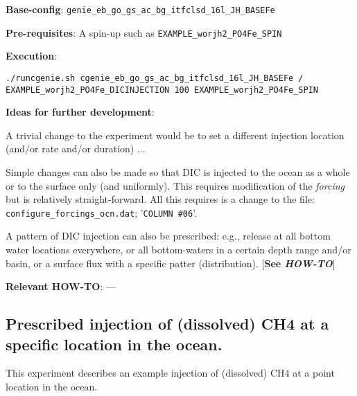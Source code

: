 \documentclass[10pt,twoside]{article}
\begin{document}
\noindent \textbf{Base-config}: \texttt{genie\_eb\_go\_gs\_ac\_bg\_itfclsd\_16l\_JH\_BASEFe}

\noindent \textbf{Pre-requisites}: A spin-up such as \texttt{EXAMPLE\_worjh2\_PO4Fe\_SPIN}

\noindent \textbf{Execution}:
\vspace{-5pt}\begin{verbatim}
./runcgenie.sh cgenie_eb_go_gs_ac_bg_itfclsd_16l_JH_BASEFe / 
EXAMPLE_worjh2_PO4Fe_DICINJECTION 100 EXAMPLE_worjh2_PO4Fe_SPIN
                \end{verbatim}\vspace{-5pt}

\noindent \textbf{Ideas for further development}:
\begin{compactenum}
        \item A trivial change to the experiment would be to set a different injection location (and/or rate and/or duration) ...
                \item Simple changes can also be made so that DIC is injected to the ocean as a whole or to the surface only (and uniformly). This requires modification of the \textit{forcing} but is relatively straight-forward. All this requires is a change to the file: \texttt{configure\_forcings\_ocn.dat}; '\texttt{COLUMN \#06}'.
                                \item A pattern of DIC injection can also be prescribed: e.g., release at all bottom water locations everywhere, or all bottom-waters in a certain depth range and/or basin, or a surface flux with a specific patter (distribution). [\textbf{See \textit{HOW-TO}}]
\end{compactenum}

\noindent \textbf{Relevant HOW-TO}: ---


\subsection{Prescribed injection of (dissolved) CH4 at a specific location in the ocean.}\label{EXAMPLE_worjh2_PO4Fe_CH4INJECTION}

This experiment describes an example injection of (dissolved) CH4 at a point location in the ocean.
\end{document}
